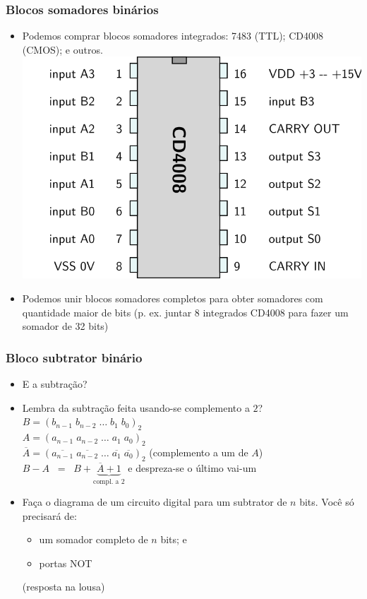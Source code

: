 \documentclass{beamer}
\begin{document}
\begin{frame}
\frametitle{Blocos somadores binários}

\begin{itemize}
\item Podemos comprar blocos somadores integrados: 7483 (TTL); CD4008 (CMOS); e outros.\\
\hspace*{\fill}\includegraphics[height=25ex]{images/4008}\hspace*{\fill}
\pause
\item Podemos unir blocos somadores completos para obter somadores com
quantidade maior de bits (p. ex. juntar 8 integrados CD4008 para fazer
um somador de 32 bits)
\end{itemize}
\end{frame}


\begin{frame}
\frametitle{Bloco subtrator binário}

\begin{itemize}
\item E a subtração?
\pause
\item Lembra da subtração feita usando-se complemento a $2$?\\
$B = (b_{n-1} \; b_{n-2} \; \ldots \; b_{1} \; b_{0})_2$\\[3pt]
$A = (a_{n-1} \; a_{n-2} \; \ldots \; a_{1} \; a_{0})_2$\\[6pt]
\pause
$\overline{A} = (\overline{a_{n-1}} \; \overline{a_{n-2}} \; \ldots \; \overline{a_{1}} \; \overline{a_{0}})_2$ (complemento a um de $A$)\\[6pt]
\pause
$B - A \; \; = \; \; B + \underbrace{\overline{A} + 1}_{\!\!\!\!\text{compl. a $2$}\!\!\!\!}$ e despreza-se o último vai-um
\pause
\item Faça o diagrama de um circuito digital para um subtrator de $n$ bits.
Você só precisará de:
\begin{itemize}
\item um somador completo de $n$ bits; e
\item portas NOT
\end{itemize}
(resposta na lousa)
\end{itemize}
\end{frame}
\end{document}
